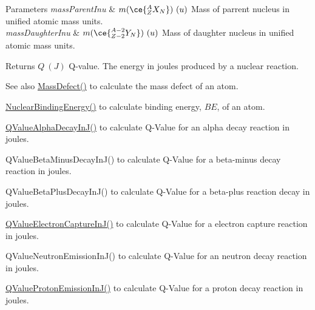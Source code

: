 \begin{DoxyParams}{Parameters}
{\em mass\+Parent\+Inu} & $m(\ce{ ^{A}_{Z}X_{N} })\ (u)$ Mass of parrent nucleus in unified atomic mass units. \\
\hline
{\em mass\+Daughter\+Inu} & $m(\ce{ ^{A-2}_{Z-2}Y_{N} })\ (u)$ Mass of daughter nucleus in unified atomic mass units. \\
\hline
\end{DoxyParams}
\begin{DoxyReturn}{Returns}
$Q\ (J)$ Q-\/value. The energy in joules produced by a nuclear reaction. 
\end{DoxyReturn}
\begin{DoxySeeAlso}{See also}
\mbox{\hyperlink{group___e_g_x_phys-_mass_defect_gae89f2dfa65992c0314adc2440b2f582a}{Mass\+Defect()}} to calculate the mass defect of an atom. 

\mbox{\hyperlink{group___e_g_x_phys-_nuclear_binding_energy_gab6832bf15ead7b4e867e759e0a2a078e}{Nuclear\+Binding\+Energy()}} to calculate binding energy, $BE$, of an atom. 

\mbox{\hyperlink{group___e_g_x_phys-_q_value-_alpha_gab8a50c18f6de3c1b6ed280c26c3ff3a5}{Q\+Value\+Alpha\+Decay\+In\+J()}} to calculate Q-\/\+Value for an alpha decay reaction in joules. 

Q\+Value\+Beta\+Minus\+Decay\+In\+J() to calculate Q-\/\+Value for a beta-\/minus decay reaction in joules. 

Q\+Value\+Beta\+Plus\+Decay\+In\+J() to calculate Q-\/\+Value for a beta-\/plus reaction decay in joules. 

\mbox{\hyperlink{group___e_g_x_phys-_q_value-_electron_capture_gaf2569f9c706130b730dcf55695780263}{Q\+Value\+Electron\+Capture\+In\+J()}} to calculate Q-\/\+Value for a electron capture reaction in joules. 

Q\+Value\+Neutron\+Emission\+In\+J() to calculate Q-\/\+Value for an neutron decay reaction in joules. 

\mbox{\hyperlink{group___e_g_x_phys-_q_value-_proton_ga41f19b0d9a2dc06e89de44aaa2d48d62}{Q\+Value\+Proton\+Emission\+In\+J()}} to calculate Q-\/\+Value for a proton decay reaction in joules. 
\end{DoxySeeAlso}
\mbox{\label{group___e_g_x_phys-_q_value-_proton_ga61d07711da603f2f4426fbb3f271fc34}} 

